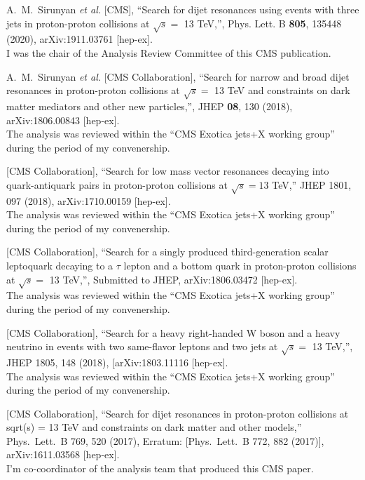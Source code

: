 \documentclass[10pt, a4paper]{article}
\begin{document}
\begin{thebibliography}{599}

A.~M.~Sirunyan \textit{et al.} [CMS],
``Search for dijet resonances using events with three jets in
proton-proton collisions at $\sqrt{s} =$ 13 TeV,'', Phys. Lett. B
\textbf{805}, 135448 (2020), arXiv:1911.03761 [hep-ex]. \\
I was the chair of the Analysis Review Committee of this CMS publication.

  A.~M.~Sirunyan {\it et al.} [CMS Collaboration],
  ``Search for narrow and broad dijet resonances in proton-proton
  collisions at $\sqrt{s}=$ 13 TeV and constraints on dark matter
  mediators and other new particles,'', JHEP \textbf{08}, 130 (2018), arXiv:1806.00843 [hep-ex]. \\
The analysis was reviewed within the ``CMS Exotica jets+X working
group'' during the period of my convenership.

  [CMS Collaboration],
  ``Search for low mass vector resonances decaying into quark-antiquark pairs in proton-proton collisions at $ \sqrt{s}=13 $ TeV,''
  JHEP 1801, 097 (2018), arXiv:1710.00159 [hep-ex].\\
The analysis was reviewed within the ``CMS Exotica jets+X working
group'' during the period of my convenership.

 [CMS Collaboration],
  ``Search for a singly produced third-generation scalar leptoquark
  decaying to a $\tau$ lepton and a bottom quark in proton-proton
  collisions at $\sqrt{s} =$ 13 TeV,'', Submitted to JHEP, arXiv:1806.03472 [hep-ex]. \\
The analysis was reviewed within the ``CMS Exotica jets+X working
group'' during the period of my convenership.

 [CMS Collaboration],
  ``Search for a heavy right-handed W boson and a heavy neutrino in
  events with two same-flavor leptons and two jets at $\sqrt{s}=$ 13
  TeV,'', JHEP 1805, 148 (2018), [arXiv:1803.11116 [hep-ex]. \\
The analysis was reviewed within the ``CMS Exotica jets+X working
group'' during the period of my convenership.

  [CMS Collaboration],
  ``Search for dijet resonances in proton-proton collisions at sqrt(s) = 13 TeV and constraints on dark matter and other models,''\\
  Phys.\ Lett.\ B 769, 520 (2017), Erratum: [Phys.\ Lett.\ B 772, 882 (2017)], arXiv:1611.03568 [hep-ex].\\
  I'm co-coordinator of the analysis team that produced this CMS paper.
 

\end{thebibliography}
\end{document}
